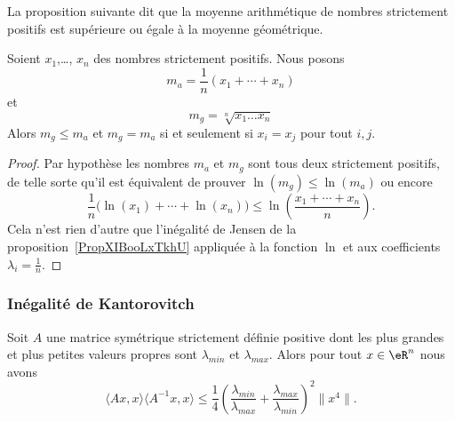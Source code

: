La proposition suivante dit que la moyenne arithmétique de nombres strictement positifs est supérieure ou égale à la moyenne géométrique.
\begin{proposition}    \label{PropWDPooBtHIAR}
    Soient \( x_1\),\ldots, \( x_n\) des nombres strictement positifs. Nous posons
    \begin{equation}
        m_a=\frac{1}{ n }(x_1+\cdots +x_n)
    \end{equation}
    et
    \begin{equation}
        m_g=\sqrt[n]{x_1\ldots x_n}
    \end{equation}
    Alors \( m_g\leq m_a\) et \( m_g=m_a\) si et seulement si \( x_i=x_j\) pour tout \( i,j\).
\end{proposition}

\begin{proof}
    Par hypothèse les nombres \( m_a\) et \( m_g\) sont tous deux strictement positifs, de telle sorte qu'il est équivalent de prouver \( \ln(m_g)\leq \ln(m_a)\) ou encore
    \begin{equation}
        \frac{1}{ n }\big( \ln(x_1)+\cdots +\ln(x_n) \big)\leq \ln\left( \frac{ x_1+\cdots +x_n }{ n } \right).
    \end{equation}
    Cela n'est rien d'autre que l'inégalité de Jensen de la proposition~\ref{PropXIBooLxTkhU} appliquée à la fonction \( \ln\) et aux coefficients \( \lambda_i=\frac{1}{ n }\).
\end{proof}

\subsubsection{Inégalité de Kantorovitch}

\begin{proposition}    \label{PropMNUooFbYkug}
    Soit \( A\) une matrice symétrique strictement définie positive dont les plus grandes et plus petites valeurs propres sont \( \lambda_{min}\) et \( \lambda_{max}\). Alors pour tout \( x\in \eR^n\) nous avons
    \begin{equation}
        \langle Ax, x\rangle \langle A^{-1}x, x\rangle \leq \frac{1}{ 4 }\left( \frac{ \lambda_{min} }{ \lambda_{max} }+\frac{ \lambda_{max} }{ \lambda_{min} } \right)^2\| x^4 \|.
    \end{equation}
\end{proposition}

